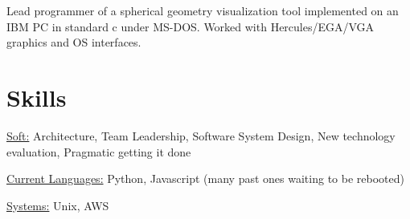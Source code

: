 \documentclass[margin]{res}
\begin{document}
\begin{resume}
                Lead programmer of a spherical geometry visualization
                tool implemented on an IBM PC in standard c under
                MS-DOS. Worked with Hercules/EGA/VGA graphics and OS
                interfaces.

    \section{Skills}
        \underline{Soft:} Architecture, Team Leadership, Software System Design, New technology evaluation,
        Pragmatic getting it done

        \underline{Current Languages:} Python, Javascript (many past ones waiting to be rebooted)

        \underline{Systems:} Unix, AWS

\end{resume}
\end{document}
